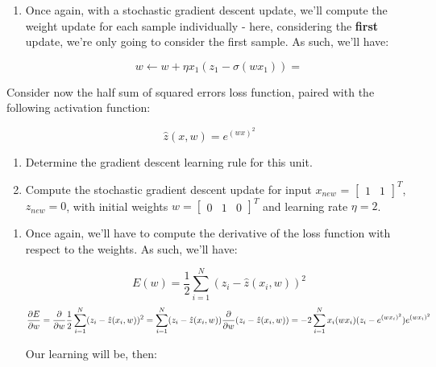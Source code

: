 \documentclass[12pt]{article}
\begin{document}
\begin{enumerate}[leftmargin=\labelsep]
\begin{enumerate}
{    }
    \item {
      Once again, with a stochastic gradient descent update, we'll compute the weight update
      for each sample individually - here, considering the \textbf{first} update,
      we're only going to consider the first sample. As such, we'll have:

      $$
        w \leftarrow w + \eta x_1 (z_1 - \sigma(w x_1)) = 
      $$
    }
  \end{enumerate}

  \begin{tcolorbox}[enhanced jigsaw,colback=bg,boxrule=0pt,arc=1pt,halign=center]
    \item Consider now the half sum of squared errors loss function, paired with
    the following activation function:

    $$
      \hat{z}(x, w) = e^{(w x)^2}
    $$

    \begin{enumerate}
      \item Determine the gradient descent learning rule for this unit.
      \item Compute the stochastic gradient descent update for input $x_{new}$ = $\begin{bmatrix} 1 & 1 \end{bmatrix}^T$,
            $z_{new} = 0$, with initial weights $w = \begin{bmatrix} 0 & 1 & 0 \end{bmatrix}^T$
            and learning rate $\eta = 2$.
    \end{enumerate}
  \end{tcolorbox}

  \begin{enumerate}
    \item {
      Once again, we'll have to compute the derivative of the loss function with
      respect to the weights. As such, we'll have:

      $$
        E(w) = \frac{1}{2} \sum_{i=1}^N (z_i - \hat{z}(x_i, w))^2
      $$
      $$
        \frac{\partial E}{\partial w} = \frac{\partial}{\partial w} \frac{1}{2} \sum_{i=1}^N (z_i - \hat{z}(x_i, w))^2 \\
        = \sum_{i=1}^N (z_i - \hat{z}(x_i, w)) \frac{\partial}{\partial w} (z_i - \hat{z}(x_i, w))
        = -2 \sum_{i=1}^N x_i (w x_i) (z_i - e^{(w x_i)^2}) e^{(w x_i)^2}
      $$

      Our learning will be, then:

}
\end{enumerate}
\end{enumerate}
\end{document}
